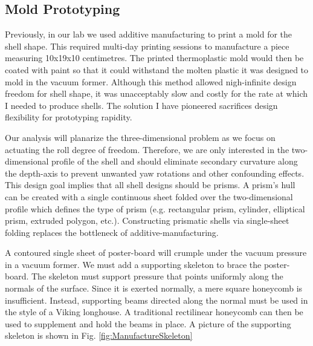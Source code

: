 \documentclass[letterpaper]{report}
\begin{document}
\subsection{Mold Prototyping}
\label{sec:Molds}
Previously, in our lab we used additive manufacturing to print a mold for the shell shape.
This required multi-day printing sessions to manufacture a piece measuring 10x19x10 centimetres.
The printed thermoplastic mold would then be coated with paint so that it could withstand the molten plastic it was designed to mold in the vacuum former.
Although this method allowed nigh-infinite design freedom for shell shape, it was unacceptably slow and costly for the rate at which I needed to produce shells.
The solution I have pioneered sacrifices design flexibility for prototyping rapidity.

Our analysis will planarize the three-dimensional problem as we focus on actuating the roll degree of freedom.
Therefore, we are only interested in the two-dimensional profile of the shell and should eliminate secondary curvature along the depth-axis to prevent unwanted yaw rotations and other confounding effects.
This design goal implies that all shell designs should be prisms.
A prism's hull can be created with a single continuous sheet folded over the two-dimensional profile which defines the type of prism (e.g. rectangular prism, cylinder, elliptical prism, extruded polygon, etc.).
Constructing prismatic shells via single-sheet folding replaces the bottleneck of additive-manufacturing.

A contoured single sheet of poster-board will crumple under the vacuum pressure in a vacuum former.
We must add a supporting skeleton to brace the poster-board.
The skeleton must support pressure that points uniformly along the normals of the surface.
Since it is exerted normally, a mere square honeycomb is insufficient.
Instead, supporting beams directed along the normal must be used in the style of a Viking longhouse.
A traditional rectilinear honeycomb can then be used to supplement and hold the beams in place.
A picture of the supporting skeleton is shown in Fig. \ref{fig:ManufactureSkeleton}
\end{document}
